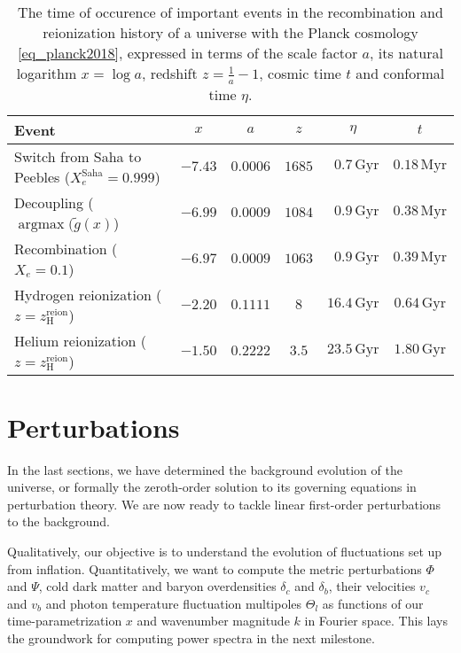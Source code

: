 \documentclass[10pt,a4paper]{article}
\DeclareMathOperator{\argmax}{argmax}
\begin{document}
\begin{table}[b]
\centering
\caption{%
	The time of occurence of important events in the recombination and reionization history of a universe with the Planck cosmology \eqref{eq_planck2018},
	expressed in terms of the scale factor $a$, its natural logarithm $x = \log a$, redshift $z = \frac1a - 1$, cosmic time $t$ and conformal time $\eta$.
}
\label{table_times2}
\begin{tabular}{l c c c c c}
	\toprule
	Event                                                               & $x$     & $a$       & $z$    & $\eta$    & $t$ \\
	\midrule
	Switch from Saha to Peebles ($X_e^\text{Saha} = 0.999$) & $-7.43$ & $0.0006$  & $1685$ & $\phantom{0}0.7\,\mathrm{Gyr}$ & $0.18\,\mathrm{Myr}$ \\
	Decoupling ($\argmax(\tilde{g}(x)$)                     & $-6.99$ & $0.0009$  & $1084$ & $\phantom{0}0.9\,\mathrm{Gyr}$ & $0.38\,\mathrm{Myr}$ \\
	Recombination ($X_e = 0.1$)                             & $-6.97$ & $0.0009$  & $1063$ & $\phantom{0}0.9\,\mathrm{Gyr}$ & $0.39\,\mathrm{Myr}$ \\
	Hydrogen reionization ($z = z^\text{reion}_\text{H}$)   & $-2.20$ & $0.1111$  & $8$    & $16.4\,\mathrm{Gyr}$ & $0.64\,\mathrm{Gyr}$ \\
	Helium reionization ($z = z^\text{reion}_\text{H}$)     & $-1.50$ & $0.2222$  & $3.5$  & $23.5\,\mathrm{Gyr}$ & $1.80\,\mathrm{Gyr}$ \\
	\bottomrule
\end{tabular}
\end{table}



\clearpage
\section{Perturbations}
\label{sec_perturbations}

\newcommand\N{\mathcal{N}}
\newcommand\aH{\mathcal{H}}

In the last sections, we have determined the background evolution of the universe,
or formally the zeroth-order solution to its governing equations in perturbation theory.
We are now ready to tackle linear first-order perturbations to the background.

Qualitatively, our objective is to understand the evolution of fluctuations set up from inflation.
Quantitatively, we want to compute the
metric perturbations $\Phi$ and $\Psi$,
cold dark matter and baryon overdensities $\delta_c$ and $\delta_b$,
their velocities $v_c$ and $v_b$
and photon temperature fluctuation multipoles $\Theta_l$
as functions of our time-parametrization $x$ and wavenumber magnitude $k$ in Fourier space.
This lays the groundwork for computing power spectra in the next milestone.
\end{document}
